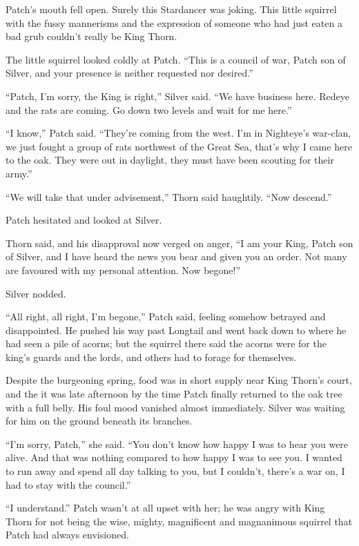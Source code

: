 \documentclass[ebook,oneside,openany,12pt]{memoir}
\begin{document}
Patch’s mouth fell open. Surely this Stardancer was joking. This
little squirrel with the fussy mannerisms and the expression of
someone who had just eaten a bad grub couldn’t really be King Thorn.

The little squirrel looked coldly at Patch. “This is a council of war,
Patch son of Silver, and your presence is neither requested nor
desired.”

“Patch, I’m sorry, the King is right,” Silver said. “We have business
here. Redeye and the rats are coming. Go down two levels and wait for
me here.”

“I know,” Patch said. “They’re coming from the west. I’m in Nighteye’s
war-clan, we just fought a group of rats northwest of the Great Sea,
that’s why I came here to the oak. They were out in daylight, they
must have been scouting for their army.”

“We will take that under advisement,” Thorn said haughtily. “Now
descend.”

Patch hesitated and looked at Silver.

Thorn said, and his disapproval now verged on anger, “I am your King,
Patch son of Silver, and I have heard the news you bear and given you
an order. Not many are favoured with my personal attention. Now
begone!”

Silver nodded.

“All right, all right, I’m begone,” Patch said, feeling somehow
betrayed and disappointed. He pushed his way past Longtail and went
back down to where he had seen a pile of acorns; but the squirrel
there said the acorns were for the king’s guards and the lords, and
others had to forage for themselves.

Despite the burgeoning spring, food was in short supply near King
Thorn’s court, and the it was late afternoon by the time Patch finally
returned to the oak tree with a full belly. His foul mood vanished
almost immediately. Silver was waiting for him on the ground beneath
its branches.

“I’m sorry, Patch,” she said. “You don’t know how happy I was to hear
you were alive. And that was nothing compared to how happy I was to
see you. I wanted to run away and spend all day talking to you, but I
couldn’t, there’s a war on, I had to stay with the council.”

“I understand.” Patch wasn’t at all upset with her; he was angry with
King Thorn for not being the wise, mighty, magnificent and magnanimous
squirrel that Patch had always envisioned.
\end{document}
